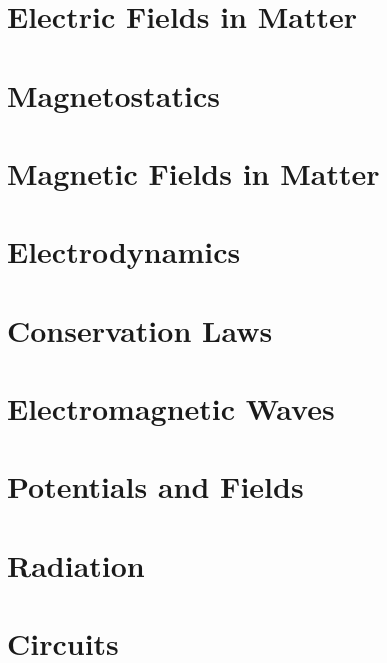\section{Electric Fields in Matter}
\section{Magnetostatics}
\section{Magnetic Fields in Matter}
\section{Electrodynamics}
\section{Conservation Laws}
\section{Electromagnetic Waves}
\section{Potentials and Fields}
\section{Radiation}
\section{Circuits}

